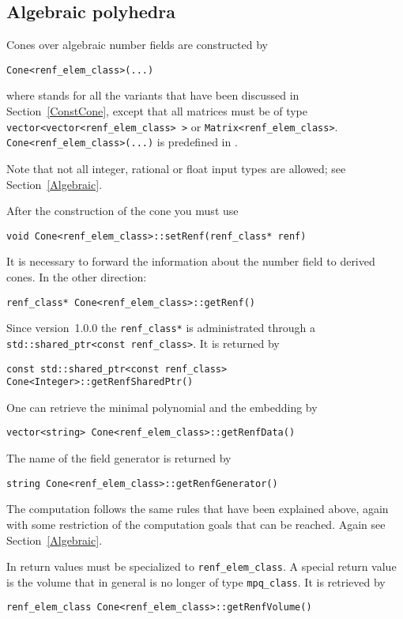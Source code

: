 \begin{small}
\subsection{Algebraic polyhedra}

Cones over algebraic number fields are constructed by
\begin{Verbatim}
Cone<renf_elem_class>(...)
\end{Verbatim}
where  stands for all the variants that have been discussed in Section~\ref{ConstCone}, except that all matrices must be of type \verb+vector<vector<renf_elem_class> >+ or \verb+Matrix<renf_elem_class>+. \verb|Cone<renf_elem_class>(...)| is predefined in .

Note that not all integer, rational or float input types are allowed; see Section~\ref{Algebraic}.

After the construction of the cone you must use
\begin{Verbatim}
void Cone<renf_elem_class>::setRenf(renf_class* renf)
\end{Verbatim}
It is necessary to forward the information about the number field to derived cones. In the other direction:
\begin{Verbatim}
renf_class* Cone<renf_elem_class>::getRenf()
\end{Verbatim}
Since version~1.0.0 the \verb|renf_class*| is administrated through a \verb|std::shared_ptr<const renf_class>|. It is returned by
\begin{Verbatim}
const std::shared_ptr<const renf_class> Cone<Integer>::getRenfSharedPtr()
\end{Verbatim}

One can retrieve the minimal polynomial and the embedding by
\begin{Verbatim}
vector<string> Cone<renf_elem_class>::getRenfData()
\end{Verbatim}
The name of the field generator is returned by
\begin{Verbatim}
string Cone<renf_elem_class>::getRenfGenerator()
\end{Verbatim}

The computation follows the same rules that have been explained above, again with some restriction of the computation goals that can be reached. Again see Section~\ref{Algebraic}.

In return values  must be specialized to \verb|renf_elem_class|. A special return value is the volume that in general is no longer of type \verb|mpq_class|. It is retrieved by
\begin{Verbatim}
renf_elem_class Cone<renf_elem_class>::getRenfVolume() 
\end{Verbatim}


\end{small}
